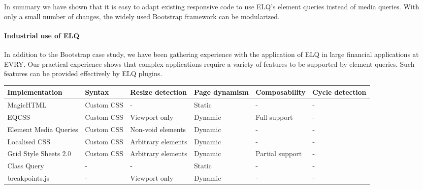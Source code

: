 \documentclass{acm_proc_article-sp}
\newcommand{\elq}{ELQ}
\begin{document}
    In summary we have shown that it is easy to adapt existing responsive code to use \elq{}'s element queries instead of media queries.
    With only a small number of changes, the widely used Bootstrap framework can be modularized.

    \paragraph{Industrial use of \elq{}}
    In addition to the Bootstrap case study, we have been gathering experience with the application of \elq{} in large financial applications at EVRY.
    Our practical experience shows that complex applications require a variety of features to be supported by element queries.
    Such features can be provided effectively by \elq{} plugins.

\begin{table*}[ht!]\center
    \tiny
    \begin{tabular}[t]{ p{3cm} l l l l l }
      Implementation & Syntax & Resize detection & Page dynamism  & Composability & Cycle detection \\
      \hline
       MagicHTML \cite{eq_imp_magichtml}                          &                       Custom CSS  &   - &                             Static &     -                  & -  \\
       EQCSS \cite{eq_imp_eqcss}                                  &                       Custom CSS  &   Viewport only &                 Dynamic &    Full support       & -  \\
       Element Media Queries \cite{eq_imp_prollyfill-min-width}   &                       Custom CSS  &   Non-void elements &             Dynamic &    -                  & -  \\
       Localised CSS \cite{eq_imp_localised-css}                  &                       Custom CSS  &   Arbitrary elements &            Dynamic &    -                  & -  \\
       Grid Style Sheets 2.0 \cite{eq_imp_gss}                    &                       Custom CSS  &   Arbitrary elements &            Dynamic &    Partial support    & -  \\
       Class Query \cite{eq_imp_classquery}                       &                                 - &   - &                             Static &     -                  & -  \\
       breakpoints.js \cite{eq_imp_breakpointsjs}                 &                                 - &   Viewport only &                 Dynamic &    -                  & -  \\

\end{tabular}
\end{table*}
\end{document}
